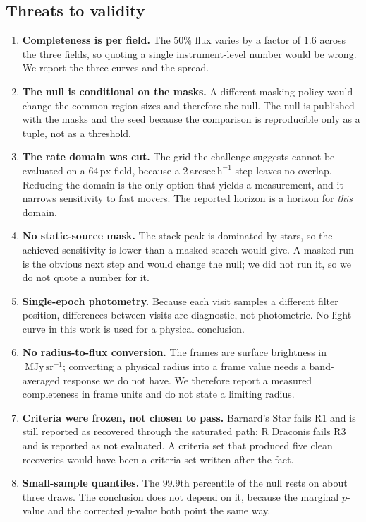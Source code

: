 \documentclass[11pt,a4paper]{article}
\newcommand{\unit}[1]{\,\mathrm{#1}}
\newcommand{\mjysr}{\ \mathrm{MJy\,sr^{-1}}}
\newcommand{\arcsec}{\unit{arcsec}}
\newcommand{\px}{\unit{px}}
\begin{document}
\subsection{Threats to validity}\label{sec:limits}
\begin{enumerate}[leftmargin=1.5em,itemsep=3pt]
\item \textbf{Completeness is per field.} The $50\%$ flux varies by a factor of
$1.6$ across the three fields, so quoting a single instrument-level number would
be wrong. We report the three curves and the spread.
\item \textbf{The null is conditional on the masks.} A different masking policy
would change the common-region sizes and therefore the null. The null is published
with the masks and the seed because the comparison is reproducible only as a
tuple, not as a threshold.
\item \textbf{The rate domain was cut.} The grid the challenge suggests cannot be
evaluated on a $64\px$ field, because a $2\arcsec\unit{h}^{-1}$ step leaves no
overlap. Reducing the domain is the only option that yields a measurement, and it
narrows sensitivity to fast movers. The reported horizon is a horizon for
\emph{this} domain.
\item \textbf{No static-source mask.} The stack peak is dominated by stars, so the
achieved sensitivity is lower than a masked search would give. A masked run is the
obvious next step and would change the null; we did not run it, so we do not quote
a number for it.
\item \textbf{Single-epoch photometry.} Because each visit samples a different
filter position, differences between visits are diagnostic, not photometric. No
light curve in this work is used for a physical conclusion.
\item \textbf{No radius-to-flux conversion.} The frames are surface brightness in
$\mjysr$; converting a physical radius into a frame value needs a band-averaged
response we do not have. We therefore report a measured completeness in frame
units and do not state a limiting radius.
\item \textbf{Criteria were frozen, not chosen to pass.} Barnard's Star fails R1
and is still reported as recovered through the saturated path; R Draconis fails R3
and is reported as not evaluated. A criteria set that produced five clean
recoveries would have been a criteria set written after the fact.
\item \textbf{Small-sample quantiles.} The $99.9$th percentile of the null rests
on about three draws. The conclusion does not depend on it, because the marginal
$p$-value and the corrected $p$-value both point the same way.
\end{enumerate}
\end{document}
